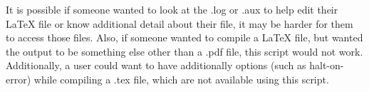 \documentclass{article}
\begin{document}
It is possible if someone wanted to look at the .log or .aux to help edit their LaTeX file or know additional detail about their file, it may be harder for them to access those files. Also, if someone wanted to compile a LaTeX file, but wanted the output to be something else other than a .pdf file, this script would not work. Additionally, a user could want to have additionally options (such as halt-on-error) while compiling a .tex file, which are not available using this script.
\end{document}
